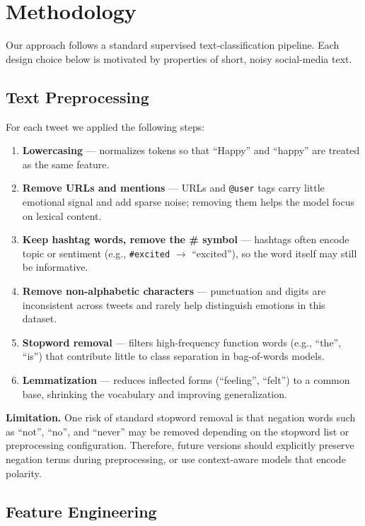 \documentclass[12pt]{article}
\begin{document}
\section{Methodology}

Our approach follows a standard supervised text-classification pipeline.
Each design choice below is motivated by properties of short, noisy social-media text.

\subsection{Text Preprocessing}

For each tweet we applied the following steps:
\begin{enumerate}
    \item \textbf{Lowercasing} --- normalizes tokens so that ``Happy'' and ``happy'' are treated as the same feature.
    \item \textbf{Remove URLs and mentions} --- URLs and \texttt{@user} tags carry little emotional signal and add sparse noise; removing them helps the model focus on lexical content.
    \item \textbf{Keep hashtag words, remove the \# symbol} --- hashtags often encode topic or sentiment (e.g., \texttt{\#excited} $\rightarrow$ ``excited''), so the word itself may still be informative.
    \item \textbf{Remove non-alphabetic characters} --- punctuation and digits are inconsistent across tweets and rarely help distinguish emotions in this dataset.
    \item \textbf{Stopword removal} --- filters high-frequency function words (e.g., ``the'', ``is'') that contribute little to class separation in bag-of-words models.
    \item \textbf{Lemmatization} --- reduces inflected forms (``feeling'', ``felt'') to a common base, shrinking the vocabulary and improving generalization.
\end{enumerate}

\textbf{Limitation.} One risk of standard stopword removal is that negation words such as ``not'', ``no'', and ``never'' may be removed depending on the stopword list or preprocessing configuration.
Therefore, future versions should explicitly preserve negation terms during preprocessing, or use context-aware models that encode polarity.

\subsection{Feature Engineering}
\end{document}
